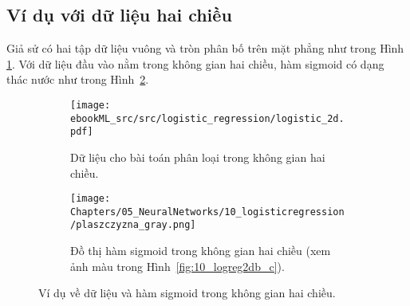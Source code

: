 







\subsection{Ví dụ với dữ liệu hai chiều}
Giả sử có hai tập dữ liệu vuông và tròn phân bố trên mặt phẳng như trong Hình \ref{fig:10_logreg2da}. Với dữ liệu đầu vào nằm trong không gian hai chiều, hàm sigmoid có dạng thác nước như trong Hình~\ref{fig:10_logreg2db}.

\begin{figure}[t]
\begin{subfigure}{0.49\textwidth}
\texttt{[image: ebookML\_src/src/logistic\_regression/logistic\_2d.pdf]}
\caption{Dữ liệu cho bài toán phân loại trong không gian hai chiều.}
\label{fig:10_logreg2da}
\end{subfigure}
\begin{subfigure}{0.45\textwidth}
\texttt{[image: Chapters/05\_NeuralNetworks/10\_logisticregression/plaszczyzna\_gray.png]}
\caption{Đồ thị hàm sigmoid trong không gian hai chiều (xem ảnh màu trong Hình~\ref{fig:10_logreg2db_c}).}
\label{fig:10_logreg2db}
\end{subfigure}
\caption{
Ví dụ về dữ liệu và hàm sigmoid trong không gian hai chiều.
}
\label{fig:10_logreg2d}
\end{figure}



